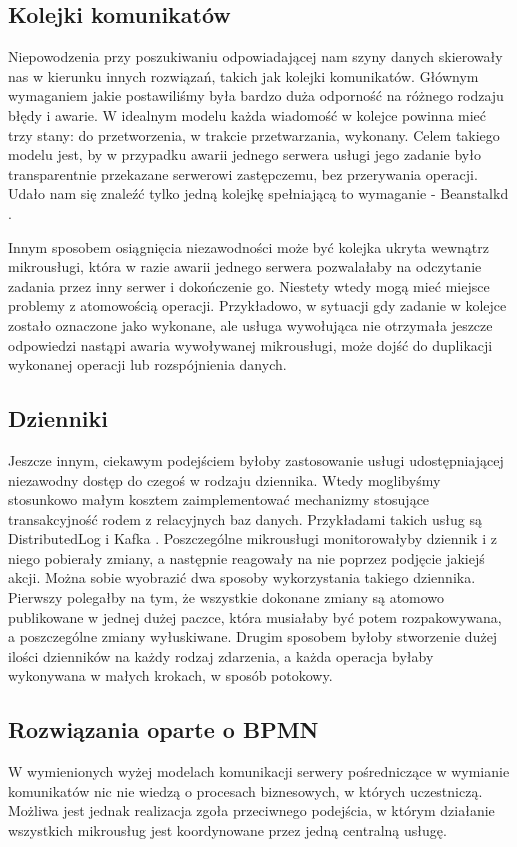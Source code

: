 \documentclass[licencjacka]{pracamgr}
\begin{document}
\subsection{Kolejki komunikatów}
Niepowodzenia przy poszukiwaniu odpowiadającej nam szyny danych skierowały nas w kierunku innych rozwiązań, takich jak
kolejki komunikatów. Głównym wymaganiem jakie postawiliśmy była bardzo duża odporność na różnego rodzaju błędy i
awarie. W idealnym modelu każda wiadomość w kolejce powinna mieć trzy stany: do przetworzenia, w trakcie przetwarzania, wykonany. Celem takiego modelu jest, by w przypadku awarii jednego serwera usługi jego zadanie było transparentnie przekazane serwerowi zastępczemu, bez przerywania operacji. Udało nam się znaleźć tylko jedną kolejkę spełniającą to wymaganie - Beanstalkd \cite{beanstalkd}.

Innym sposobem osiągnięcia niezawodności może być kolejka ukryta wewnątrz mikrousługi, która w razie awarii jednego serwera pozwalałaby na odczytanie zadania przez inny serwer i dokończenie go. Niestety wtedy mogą mieć miejsce problemy z atomowością operacji. Przykładowo, w sytuacji gdy zadanie w kolejce zostało oznaczone jako wykonane, ale usługa wywołująca nie otrzymała jeszcze odpowiedzi nastąpi awaria wywoływanej mikrousługi, może dojść do duplikacji wykonanej operacji lub rozspójnienia danych.

\subsection{Dzienniki}

Jeszcze innym, ciekawym podejściem byłoby zastosowanie usługi udostępniającej niezawodny dostęp do czegoś w rodzaju dziennika. Wtedy moglibyśmy stosunkowo małym kosztem zaimplementować mechanizmy stosujące transakcyjność rodem z relacyjnych baz danych. Przykładami takich usług są DistributedLog \cite{distibutedlog} i Kafka \cite{kafka}. Poszczególne mikrousługi monitorowałyby dziennik i z niego pobierały zmiany, a następnie reagowały na nie poprzez podjęcie jakiejś akcji. Można sobie wyobrazić dwa sposoby wykorzystania takiego dziennika. Pierwszy polegałby na tym, że wszystkie dokonane zmiany są atomowo publikowane w jednej dużej paczce, która musiałaby być potem rozpakowywana, a poszczególne zmiany wyłuskiwane. Drugim sposobem byłoby stworzenie dużej ilości dzienników na każdy rodzaj zdarzenia, a każda operacja byłaby wykonywana w małych krokach, w sposób potokowy.

\subsection{Rozwiązania oparte o BPMN}
W wymienionych wyżej modelach komunikacji serwery pośredniczące w wymianie
komunikatów nic nie wiedzą o procesach biznesowych, w których uczestniczą. 
Możliwa jest jednak realizacja zgoła przeciwnego podejścia, w którym działanie
wszystkich mikrousług jest koordynowane przez jedną centralną usługę.
\end{document}
